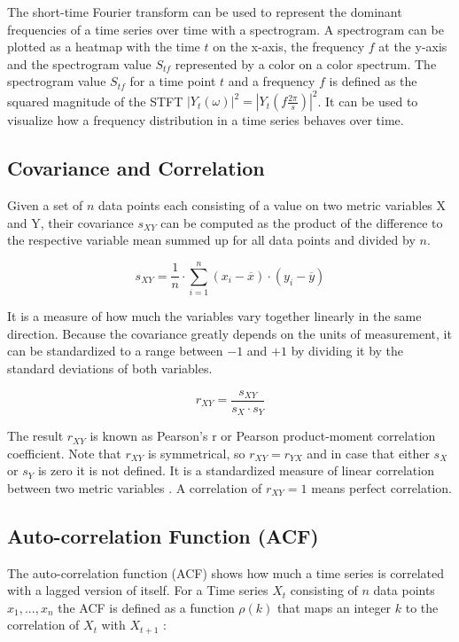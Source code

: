 \documentclass[12 pt]{scrartcl}
\begin{document}
The short-time Fourier transform can be used to represent the dominant frequencies of a time series over time with a spectrogram.
A spectrogram can be plotted as a heatmap with the time $t$ on the x-axis, the frequency $f$ at the y-axis and the spectrogram value $S_{tf}$ represented by a color on a color spectrum.
The spectrogram value $S_{tf}$ for a time point $t$ and a frequency $f$ is defined as the squared magnitude of the STFT $|Y_t(\omega)|^2 = |Y_t(f \frac{2 \pi}{s})|^2$.
It can be used to visualize how a frequency distribution in a time series behaves over time.

\subsection{Covariance and Correlation}

Given a set of $n$ data points each consisting of a value on two metric variables X and Y, their covariance $s_{XY}$ can be computed as the product of the difference to the respective variable mean summed up for all data points and divided by $n$.

\[ s_{XY} = \frac{1}{n} \cdot  \sum_{i=1}^{n}{(x_i - \overline{x}) \cdot (y_i - \overline{y})}\]

It is a measure of how much the variables vary together linearly in the same direction.
Because the covariance greatly depends on the units of measurement, it can be standardized to a range between $-1$ and $+1$ by dividing it by the standard deviations of both variables.

\[ r_{XY} =  \frac{s_{XY}}{s_X \cdot s_Y} \]

The result $r_{XY}$ is known as Pearson's r or Pearson product-moment correlation coefficient. Note that $r_{XY}$ is symmetrical, so $r_{XY} = r_{YX}$ and in case that either $s_X$ or $s_Y$ is zero it is not defined. It is a standardized measure of linear correlation between two metric variables \citep[p.~538]{eid2017statistik}. A correlation of $r_{XY} = 1$ means perfect correlation.


\subsection{Auto-correlation Function (ACF)}

The auto-correlation function (ACF) shows how much a time series is correlated with a lagged version of itself. For a Time series $X_t$ consisting of $n$ data points $x_1, ..., x_n$ the ACF is defined as a function $\rho(k)$ that maps an integer $k$ to the correlation of $X_t$ with $X_{t+1}$ \citep[p.~4]{deistler2022time}:
\end{document}
